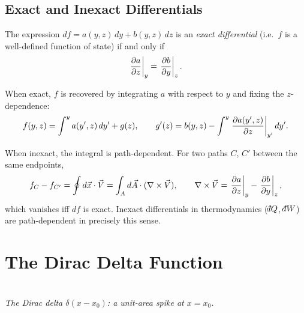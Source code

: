 \subsection{Exact and Inexact Differentials}

The expression $df = a(y,z)\,dy + b(y,z)\,dz$ is an \emph{exact differential} (i.e.\ $f$ is a well-defined function of state) if and only if
\begin{equation}
    \left.\pdv{a}{z}\right|_y = \left.\pdv{b}{y}\right|_z.
\end{equation}

When exact, $f$ is recovered by integrating $a$ with respect to $y$ and fixing the $z$-dependence:
\begin{equation}
    f(y,z) = \int^y a(y', z)\,dy' + g(z), \qquad g'(z) = b(y,z) - \int^y \left.\pdv{a(y',z)}{z}\right|_{y'} dy'.
\end{equation}

When inexact, the integral is path-dependent. For two paths $C$, $C'$ between the same endpoints,
\begin{equation}
    f_C - f_{C'} = \oint d\vec{x}\cdot\vec{V} = \int_A d\vec{A}\cdot(\nabla\times\vec{V}), \qquad
    \nabla\times\vec{V} = \left.\pdv{a}{z}\right|_y - \left.\pdv{b}{y}\right|_z,
\end{equation}
which vanishes iff $df$ is exact. Inexact differentials in thermodynamics ($\dbar Q$, $\dbar W$) are path-dependent in precisely this sense.

\section{The Dirac Delta Function}

\begin{center}
\\[3pt]
{\small\itshape The Dirac delta $\delta(x-x_0)$: a unit-area spike at $x=x_0$.}
\end{center}

